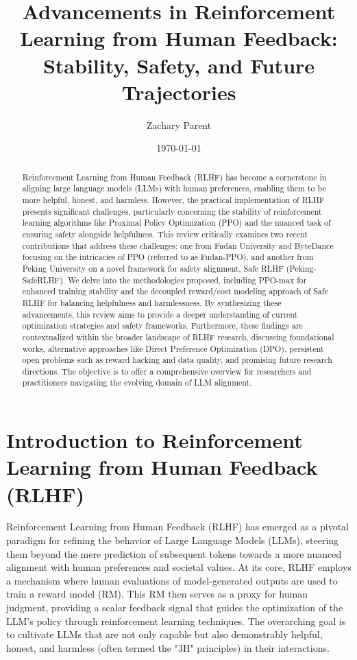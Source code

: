 \documentclass[10pt,journal,compsoc]{IEEEtran} %
\title{Advancements in Reinforcement Learning from Human Feedback: Stability, Safety, and Future Trajectories}
\author{Zachary Parent}
\date{\today}
\begin{document}
\maketitle

\begin{abstract}
Reinforcement Learning from Human Feedback (RLHF) has become a cornerstone in aligning large language models (LLMs) with human preferences, enabling them to be more helpful, honest, and harmless. However, the practical implementation of RLHF presents significant challenges, particularly concerning the stability of reinforcement learning algorithms like Proximal Policy Optimization (PPO) and the nuanced task of ensuring safety alongside helpfulness. This review critically examines two recent contributions that address these challenges: one from Fudan University and ByteDance focusing on the intricacies of PPO (referred to as Fudan-PPO), and another from Peking University on a novel framework for safety alignment, Safe RLHF (Peking-SafeRLHF). We delve into the methodologies proposed, including PPO-max for enhanced training stability and the decoupled reward/cost modeling approach of Safe RLHF for balancing helpfulness and harmlessness. By synthesizing these advancements, this review aims to provide a deeper understanding of current optimization strategies and safety frameworks. Furthermore, these findings are contextualized within the broader landscape of RLHF research, discussing foundational works, alternative approaches like Direct Preference Optimization (DPO), persistent open problems such as reward hacking and data quality, and promising future research directions. The objective is to offer a comprehensive overview for researchers and practitioners navigating the evolving domain of LLM alignment.
\end{abstract}

\section{Introduction to Reinforcement Learning from Human Feedback (RLHF)}
\label{sec:introduction}

Reinforcement Learning from Human Feedback (RLHF) has emerged as a pivotal paradigm for refining the behavior of Large Language Models (LLMs), steering them beyond the mere prediction of subsequent tokens towards a more nuanced alignment with human preferences and societal values. \cite{Ouyang2022InstructGPT, WikipediaRLHFPage} At its core, RLHF employs a mechanism where human evaluations of model-generated outputs are used to train a reward model (RM). This RM then serves as a proxy for human judgment, providing a scalar feedback signal that guides the optimization of the LLM's policy through reinforcement learning techniques. \cite{AWSRLHFExplainer} The overarching goal is to cultivate LLMs that are not only capable but also demonstrably helpful, honest, and harmless (often termed the "3H" principles) in their interactions. \cite{Ouyang2022InstructGPT}
\end{document}
